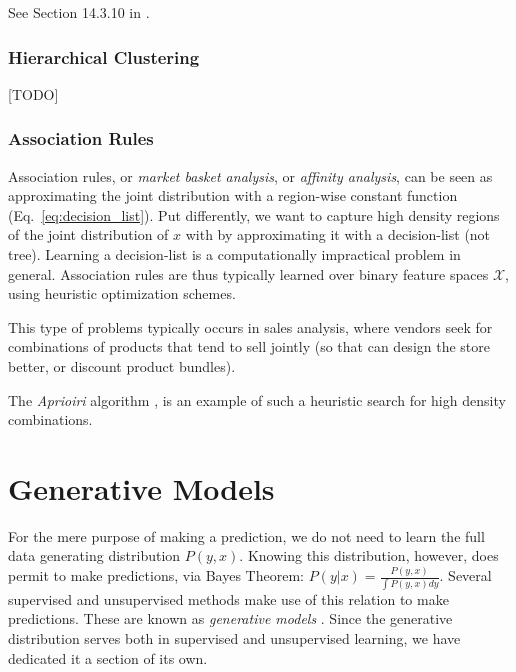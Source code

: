 \documentclass[12pt,a4paper]{article}
\theoremstyle{plain}
\theoremstyle{definition}
\newcommand{\dist}{P}
\newcommand{\featureS}{\mathcal{X}}
\begin{document}
See Section 14.3.10 in \cite{hastie_elements_2003}.


\subsubsection{Hierarchical Clustering}
\label{sec:hierarchical}
[TODO]



\subsubsection{Association Rules}
\label{sec:association}
Association rules, or \emph{market basket analysis}, or \emph{affinity analysis}, can be seen as approximating the joint distribution with a region-wise constant function (Eq.~\ref{eq:decision_list}).
Put differently, we want to capture high density regions of the joint distribution of $x$ with by approximating it with a decision-list (not tree).
Learning a decision-list is a computationally impractical problem in general. Association rules are thus typically learned over binary feature spaces $\featureS$, using heuristic optimization schemes.

This type of problems typically occurs in sales analysis, where vendors seek for combinations of products that tend to sell jointly (so that can design the store better, or discount product bundles).

The \emph{Aprioiri} algorithm \cite{agraval_fast_1994}, is an example of such a heuristic search for high density combinations.








\section{Generative Models}
For the mere purpose of making a prediction, we do not need to learn the full data generating distribution $\dist(y,x)$. 
Knowing this distribution, however, does permit to make predictions, via Bayes Theorem: 
$\dist(y|x)=\frac{\dist(y,x)}{\int\dist(y,x)dy}$.
Several supervised and unsupervised methods make use of this relation to make predictions. These are known as \emph{generative models} .
Since the generative distribution serves both in supervised and unsupervised learning, we have dedicated it a section of its own.
\end{document}
